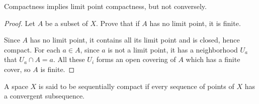 \begin{theorem}
    Compactness implies limit point compactness, but not conversely.    
\end{theorem}
\begin{proof}
    Let $A$ be a subset of $X$. Prove that if $A$ has no limit point, it is finite. 
    
    Since $A$ has no limit point, it contains all its limit point and is closed, hence compact. For each $a \in A$, since $a$ is not a limit point, it has a neighborhood $U_a$ that $U_a \cap A = a$. All these $U_i$ forms an open covering of $A$ which has a finite cover, so $A$ is finite.
\end{proof}

\begin{definition}
    A space $X$ is said to be sequentially compact if every sequence of points of $X$ has a convergent subsequence.
\end{definition}

